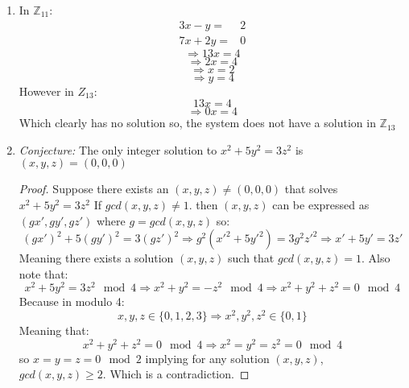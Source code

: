 \documentclass[11pt] {article}
\newcommand{\Z}{\mathbb{Z}}
\newcommand{\T}{\mathcal{T}}
\begin{document}
\begin{enumerate}
\begin{enumerate}
\item 
\[
\T_{W_{P_1,Y,Z}}=  \begin{cases} 
      \hfill \T_Y \hfill & \text{  if $ V(P_1) = T $} \\
      \hfill \T_Z \hfill & \text{  if $ V(P_1) = F $} \\
  \end{cases}
 \]

\item 
\begin{proof}
Note that: 
\begin{align*}
V(\phi \land \psi) & = V(\sim (\phi \Rightarrow \sim \psi)) \\
V(\phi \lor \psi) & = V(\sim \phi \Rightarrow \psi)\\
V(\phi \Leftrightarrow \psi) & = V((\phi \Rightarrow \psi) \land (\phi \Rightarrow \psi))
\end{align*} 
For any WFF's $\phi$ and $\psi$ . Therefore by induction all WWF's can be expressed in terms of $\sim$ and $\Rightarrow$ 
\end{proof}
\end{enumerate}
\item
In $\Z_{11}$:
\begin{align*}
3x  -  y  =  & 2\\
7x  +  2y  = & 0
\end{align*}
$$\Rightarrow 13x = 4$$
$$\Rightarrow 2x = 4$$
$$\Rightarrow x = 2$$
$$\Rightarrow y = 4 $$
However in $Z_{13}$:
$$13x = 4$$
$$\Rightarrow 0x = 4$$
Which clearly has no solution so, the system does not have a solution in $ \Z_{13} $
\item
\textit{Conjecture:} The only integer solution to $ x^2+5y^2 = 3z^2 $ is $(x,y,z) = (0,0,0)$
\begin{proof}
Suppose there exists an $ (x,y,z) \neq (0,0,0) $ that solves $ x^2+5y^2 =3z^2$ \newline
If $gcd(x,y,z) \neq 1$. then $(x,y,z)$ can be expressed as $(gx',gy',gz')$ where $ g = gcd(x,y,z)$
so: $$ (gx')^2 + 5(gy')^2 =3(gz')^2 \Rightarrow  g^2(x'^2 + 5y'^2) =3g^2z'^2 \Rightarrow x' + 5y' = 3z' $$
Meaning there exists a solution $(x,y,z) $ such that $gcd(x,y,z) = 1.$\newline
Also note that: $$ x^2+5y^2 = 3z^2 \mod 4 \Rightarrow x^2+y^2 = -z^2 \mod 4 \Rightarrow x^2+y^2+z^2 = 0 \mod 4 $$
Because in modulo  4: $$ x,y,z \in \{0,1,2,3\} \Rightarrow x^2,y^2,z^2 \in \{0,1\} $$  
Meaning that:  $$x^2+y^2+z^2 = 0 \mod 4 \Rightarrow x^2=y^2=z^2 = 0 \mod 4$$
so $x=y=z=0 \mod 2$ implying for any solution $(x,y,z)$, $gcd(x,y,z) \geq 2$. 
Which is a contradiction.    
\end{proof}
\end{enumerate}
 
\end{document}
